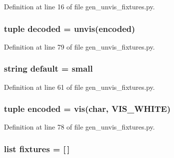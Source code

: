 Definition at line 16 of file gen\+\_\+unvis\+\_\+fixtures.\+py.

\subsubsection[{decoded}]{\setlength{\rightskip}{0pt plus 5cm}tuple decoded = unvis({\bf encoded})}\label{namespacegen__unvis__fixtures_a769e98af96c343b993980d1a9fb9d811}


Definition at line 79 of file gen\+\_\+unvis\+\_\+fixtures.\+py.

\subsubsection[{default}]{\setlength{\rightskip}{0pt plus 5cm}string default = \textquotesingle{}small\textquotesingle{}}\label{namespacegen__unvis__fixtures_a754b5fad2e8282925389fd7ebcc1f6a1}


Definition at line 61 of file gen\+\_\+unvis\+\_\+fixtures.\+py.

\subsubsection[{encoded}]{\setlength{\rightskip}{0pt plus 5cm}tuple encoded = vis({\bf char}, V\+I\+S\+\_\+\+W\+H\+I\+T\+E)}\label{namespacegen__unvis__fixtures_a8541ad804f4a9318b8aa22a3955f71a9}


Definition at line 78 of file gen\+\_\+unvis\+\_\+fixtures.\+py.

\subsubsection[{fixtures}]{\setlength{\rightskip}{0pt plus 5cm}list fixtures = [$\,$]}\label{namespacegen__unvis__fixtures_af8100621224cdc9e40326911383d8399}


